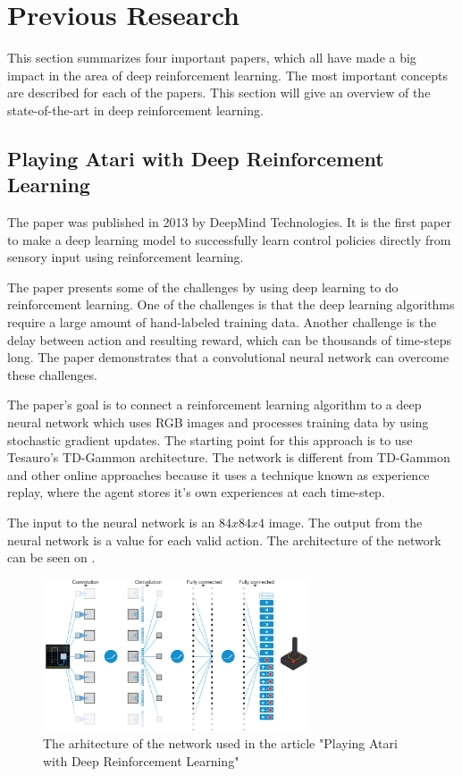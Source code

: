 \section{Previous Research}
\label{Previous_Research}
This section summarizes four important papers, which all have made a big impact in the area of deep reinforcement learning. The most important concepts are described for each of the papers. This section will give an overview of the state-of-the-art in deep reinforcement learning.    

\subsection{Playing Atari with Deep Reinforcement Learning }
The paper \cite{DBLP:journals/corr/MnihKSGAWR13} was published in 2013 by DeepMind Technologies. It is the first paper to make a deep learning model to successfully learn control policies directly from sensory input using reinforcement learning. 

The paper presents some of the challenges by using deep learning to do reinforcement learning. One of the challenges is that the deep learning algorithms require a large amount of hand-labeled training data. Another challenge is the delay between action and resulting reward, which can be thousands of time-steps long. The paper demonstrates that a convolutional neural network can overcome these challenges.  

The paper's goal is to connect a reinforcement learning algorithm to a deep neural network which uses RGB images and processes training data by using stochastic gradient updates. The starting point for this approach is to use Tesauro's TD-Gammon \cite{Tesauro:1995:TDL:203330.203343} architecture. The network is different from TD-Gammon and other online approaches because it uses a technique known as experience replay, where the agent stores it's own experiences at each time-step.

The input to the neural network is an $84 x 84 x 4$ image. The output from the neural network is a value for each valid action. The architecture of the network can be seen on .
   
\begin{figure}[H]
	\centering
	\includegraphics[width=0.7\textwidth]{Figures/TheoreticalBackground/playing_atari.jpg}
	\caption{The arhitecture of the network used in the article "Playing Atari with Deep Reinforcement Learning"}
	\label{fig:playing_atari}
\end{figure} 

